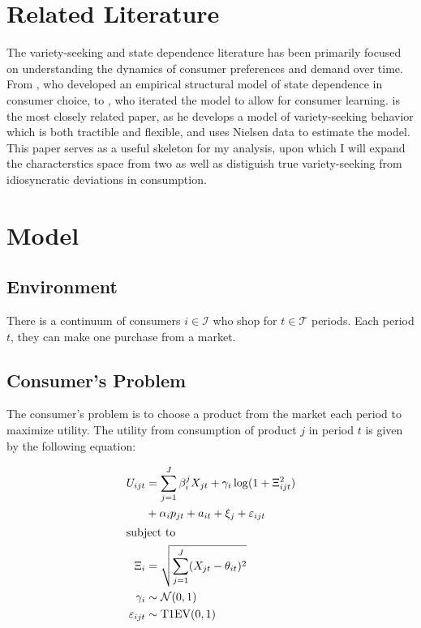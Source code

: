 \documentclass[12pt]{article}
\begin{document}
\section{Related Literature}

    The variety-seeking and state dependence literature has been primarily focused on understanding the dynamics of consumer preferences and demand over time. From \cite{lattin_model_1987}, who developed an empirical structural model of state dependence in consumer choice, to \citet{erdem_decision-making_1996}, who iterated the model to allow for consumer learning. \cite{chintagunta_variety_1999} is the most closely related paper, as he develops a model of variety-seeking behavior which is both tractible and flexible, and uses Nielsen data to estimate the model. This paper serves as a useful skeleton for my analysis, upon which I will expand the characterstics space from two as well as distiguish true variety-seeking from idiosyncratic deviations in consumption.


\section{Model}

    \subsection{Environment}
    There is a continuum of consumers $i\in\mathcal{I}$ who shop for $t\in\mathcal{T}$ periods. Each period $t$, they can make one purchase from a market. 
    \subsection{Consumer's Problem}
    The consumer's problem is to choose a product from the market each period to maximize utility. The utility from consumption of product $j$ in period $t$ is given by the following equation:

    \begin{alignat*}{1}
      U_{ijt} &= \sum_{j=1}^J\beta_i^j X_{jt} + \gamma_i \log(1 + \Xi_{ijt}^2) \\
           &+ \alpha_i p_{jt} + a_{it} + \xi_j + \varepsilon_{ijt} \\
    \shortintertext{subject to}
       \Xi_i &= \sqrt{\sum_{j=1}^J(X_{jt}-\theta_{it})^2} \\
       \gamma_i &\sim \mathcal{N}(0, 1)\\ \varepsilon_{ijt} &\sim \text{T1EV}(0,1)
    \end{alignat*}
\end{document}
